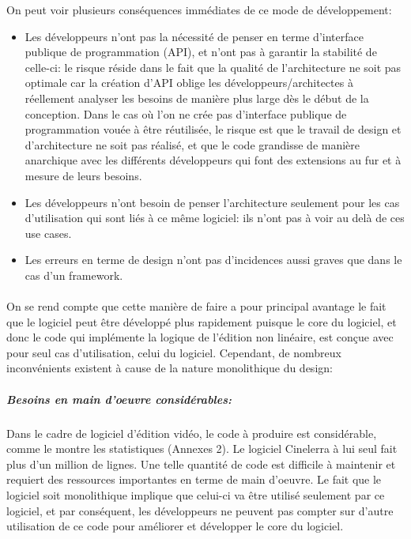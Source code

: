 On peut voir plusieurs conséquences immédiates de ce mode de
développement:

\begin{itemize} \setlength{\itemsep}{2mm}

  \item {Les développeurs n'ont pas la nécessité de penser
    en terme d'interface publique de programmation (API), et
    n'ont pas à garantir la stabilité de celle-ci: le risque réside dans le fait que
    la qualité de l'architecture ne soit pas optimale car
    la création d'API oblige les développeurs/architectes
    à réellement analyser les besoins de manière plus large dès le
    début de la conception. Dans le cas où l'on ne crée pas d'interface
    publique de programmation vouée à être réutilisée, le risque est
    que le travail de design et d'architecture ne soit pas réalisé,
    et que le code grandisse de manière anarchique avec les différents
    développeurs qui font des extensions au fur et à mesure de leurs besoins.}

  \item {Les développeurs n'ont besoin de penser l'architecture
	seulement pour les cas d'utilisation qui sont liés à ce même logiciel:
    ils n'ont pas à voir au delà de ces use cases.}

  \item {Les erreurs en terme de design n'ont pas d'incidences aussi
    graves que dans le cas d'un framework.}
\end {itemize}

\paragraph{}

On se rend compte que cette manière de faire a pour principal avantage
le fait que le logiciel peut être développé plus rapidement puisque
le core du logiciel, et donc le code qui implémente la logique de
l'édition non linéaire, est conçue avec pour seul cas d'utilisation,
celui du logiciel. Cependant, de nombreux inconvénients existent à cause de
la nature monolithique du design:

\subparagraph{Besoins en main d'oeuvre considérables:}

\subparagraph { }

Dans le cadre de logiciel d'édition vidéo, le code à produire est
considérable, comme le montre les statistiques (Annexes 2). Le logiciel
Cinelerra à lui seul fait plus d'un million de lignes. Une telle
quantité de code est difficile à maintenir et requiert des ressources
importantes en terme de main d'oeuvre. Le fait que le logiciel soit
monolithique implique que celui-ci va être utilisé
seulement par ce logiciel, et par conséquent, les développeurs ne peuvent
pas compter sur d'autre utilisation de ce code pour améliorer et développer
le core du logiciel.

